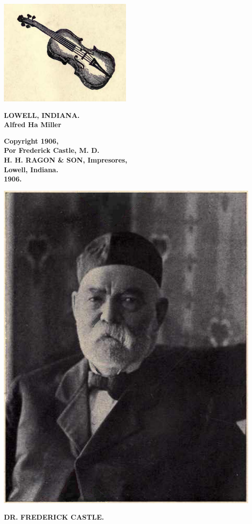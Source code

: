 
\begin{center}
\includegraphics[width=0.5\textwidth]{../img/violin.png}
\end{center}

\begin{center}
\textbf{LOWELL, INDIANA.\\
Alfred Ha Miller}

\textbf{Copyright 1906,\\
Por Frederick Castle, M. D.\\
H. H. RAGON \& SON, Impresores,\\
Lowell, Indiana.\\
1906.}
\end{center}

\begin{center}
\includegraphics[width=1\textwidth]{../img/foto.png}
\par\smallskip
    \textbf{DR. FREDERICK CASTLE. }
\end{center}